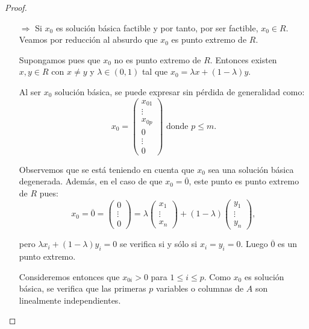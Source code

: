 \begin{proof}
  \begin{enumerate}
    \item[$\Longrightarrow$] Si $x_0$ es solución básica factible y por tanto, por ser factible, $x_0\in R$. Veamos por reducción al absurdo que $x_0$ es punto extremo de $R$.
    
    Supongamos pues que $x_0$ no es punto extremo de $R$. Entonces existen $x,y\in R$ con $x\neq y$ y $\lambda\in(0,1)$ tal que $x_0=\lambda x + (1-\lambda)y$.
    
    Al ser $x_0$ solución básica, se puede expresar sin pérdida de generalidad como:
    $$
    x_0=
    \left(
      \begin{array}{c}
        x_{01}\\ \vdots \\x_{0p}\\ 0 \\ \vdots \\ 0
      \end{array}\right) \text{ donde $p\le m$.}$$
    
    Observemos que se está teniendo en cuenta que $x_0$ sea una solución básica degenerada. Además, en el caso de que $x_0=\overline{0}$, este punto es punto extremo de $R$ pues:
    $$x_0=\overline{0}=
    \left(
      \begin{array}{c}
        0\\\vdots\\0
      \end{array}\right)=
    \lambda
    \left(
      \begin{array}{c}
        x_1\\\vdots\\ x_n
      \end{array}\right)
    +(1-\lambda)
    \left(
      \begin{array}{c}
        y_1\\\vdots\\ y_n
      \end{array}
    \right),$$
		
    pero $\lambda x_i + (1-\lambda)y_i=0$ se verifica si y sólo si $x_i=y_i=0$. Luego $\overline{0}$ es un punto extremo.
		
    Consideremos entonces que $x_{0i}>0$ para $1\le i\le p$. Como $x_0$ es solución básica, se verifica que las primeras $p$ variables o columnas de $A$ son linealmente independientes.
		

\end{enumerate}
\end{proof}

